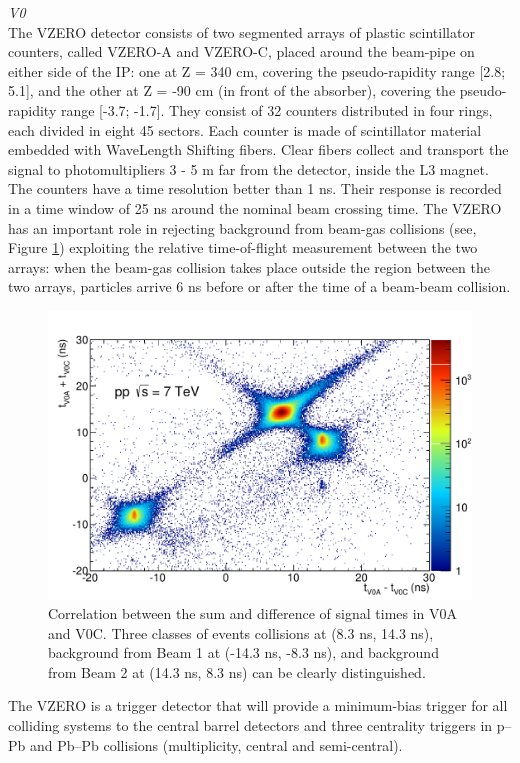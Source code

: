 {\Large\textsl{V0}}\\
The VZERO detector \cite{cite:V0} consists of two segmented arrays of plastic scintillator counters, called VZERO-A and VZERO-C, placed around the beam-pipe on either side of the IP: one at Z = 340 cm, covering the pseudo-rapidity range [2.8; 5.1], and the other at Z = -90 cm (in front of the absorber), covering the pseudo-rapidity range [-3.7; -1.7]. They consist of 32 counters distributed in four rings, each divided in eight 45  sectors. Each counter is made of scintillator material embedded with WaveLength Shifting fibers. Clear fibers collect and transport the signal to photomultipliers 3 - 5 m far from the detector, inside the L3 magnet. The counters have a time resolution better than 1 ns. Their response is recorded in a time window of 25 ns around the nominal beam crossing time.
The VZERO has an important role in rejecting background from beam-gas collisions (see, Figure \ref{fig:v0}) exploiting the relative time-of-flight measurement between the two arrays: when the beam-gas collision takes place outside the region between the two arrays, particles arrive 6 ns before or after the time of a beam-beam collision.

\begin{figure}[htbp]
\begin{center}
\includegraphics[width=10.cm]{./Version1/FigChapter4/FigureV0}
\caption{Correlation between the sum and difference of signal times in V0A and V0C. Three classes of events collisions at (8.3 ns, 14.3 ns), background from Beam 1 at (-14.3 ns, -8.3 ns), and background from Beam 2 at (14.3 ns, 8.3 ns) can be clearly distinguished.}
\label{fig:v0}
\end{center}
\end{figure}

The VZERO is a trigger detector that will provide a minimum-bias trigger for all colliding systems to the central barrel detectors and three centrality triggers in p--Pb and Pb--Pb collisions (multiplicity, central and semi-central).  

